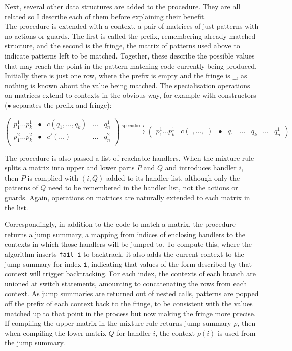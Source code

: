 Next, several other data structures are added to the procedure. They are all related so I describe each of them before explaining their benefit. \\
The procedure is extended with a context, a pair of matrices of just patterns with no actions or guards. The first is called the prefix, remembering already matched structure, and the second is the fringe, the matrix of patterns used above to indicate patterns left to be matched. Together, these describe the possible values that may reach the point in the pattern matching code currently being produced. Initially there is just one row, where the prefix is empty and the fringe is \verb|_|, as nothing is known about the value being matched. The specialisation operations on matrices extend to contexts in the obvious way, for example with constructors ($\bullet$ separates the prefix and fringe):

$
\begin{pmatrix}
 p^1_1 \dots  p^1_k & \bullet & c(q_1, \dots, q_k) & \dots & q^1_n \\
 p^2_1 \dots  p^2_k &\bullet & c'(\dots)  & \dots & q^2_n  \\
\end{pmatrix}
\xrightarrow{\text{specialise } c}
\begin{pmatrix}
p^1_1 \dots  p^1_k  & c(\_, \dots, \_) & \bullet &  q_1 & \dots & q_k & \dots &  q^1_n 
\end{pmatrix}
$

The procedure is also passed a list of reachable handlers. When the mixture rule splits a matrix into upper and lower parts $P$ and $Q$ and introduces handler $i$, then $P$ is complied with $(i, Q)$ added to its handler list, although only the patterns of $Q$ need to be remembered in the handler list, not the actions or guards. Again, operations on matrices are naturally extended to each matrix in the list. 

Correspondingly, in addition to the code to match a matrix, the procedure returns a jump summary, a mapping from indices of enclosing handlers to the contexts in which those handlers will be jumped to. To compute this, where the algorithm inserts \verb|fail i| to backtrack, it also adds the current context to the jump summary for index \verb|i|, indicating that values of the form described by that context will trigger backtracking. For each index, the contexts of each branch are unioned at switch statements, amounting to concatenating the rows from each context. As jump summaries are returned out of nested calls, patterns are popped off the prefix of each context back to the fringe, to be consistent with the values matched up to that point in the process but now making the fringe more precise. \\
If compiling the upper matrix in the mixture rule returns jump summary $\rho$, then when compiling the lower matrix $Q$ for handler $i$, the context $\rho(i)$ is used from the jump summary.\\


